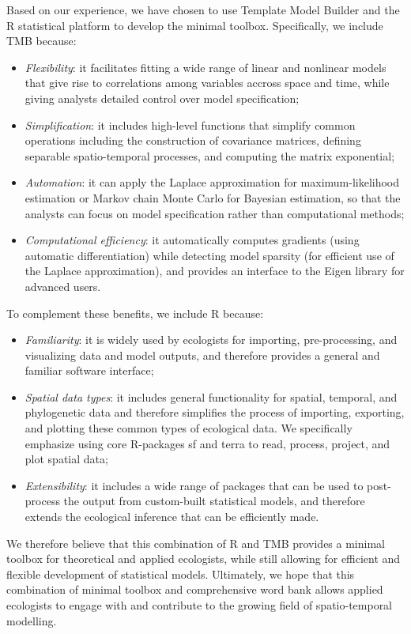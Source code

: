 Based on our experience, we have chosen to use Template Model Builder \cite{kristensen_tmb_2016} and the R statistical platform \cite{r_core_team_r_2021} to develop the minimal toolbox.  Specifically, we include TMB because:
\begin{itemize}
    \item \textit{Flexibility}:  it facilitates fitting a wide range of linear and nonlinear models that give rise to correlations among variables accross space and time, while giving analysts detailed control over model specification;
    
    \item \textit{Simplification}:  it includes high-level functions that simplify common operations including the construction of covariance matrices, defining separable spatio-temporal processes, and computing the matrix exponential;
    
    \item \textit{Automation}: it can apply the Laplace approximation for maximum-likelihood estimation or Markov chain Monte Carlo for Bayesian estimation, so that the analysts can focus on model specification rather than computational methods;
    
    \item \textit{Computational efficiency}: it automatically computes gradients (using automatic differentiation) while detecting model sparsity (for efficient use of the Laplace approximation), and provides an interface to the Eigen library for advanced users.
\end{itemize}
To complement these benefits, we include R because:
\begin{itemize}
    \item \textit{Familiarity}:  it is widely used by ecologists for importing, pre-processing, and visualizing data and model outputs, and therefore provides a general and familiar software interface;
    
    \item \textit{Spatial data types}:  it includes general functionality for spatial, temporal, and phylogenetic data and therefore simplifies the process of importing, exporting, and plotting these common types of ecological data.  We specifically emphasize using core R-packages \colorbox{backcolour}{sf} \cite{pebesma_simple_2018} and \colorbox{backcolour}{terra} \cite{hijmans_package_2022} to read, process, project, and plot spatial data;

    \item \textit{Extensibility}:  it includes a wide range of packages that can be used to post-process the output from custom-built statistical models, and therefore extends the ecological inference that can be efficiently made.
\end{itemize}
We therefore believe that this combination of R and TMB provides a minimal toolbox for theoretical and applied ecologists, while still allowing for efficient and flexible development of statistical models.  Ultimately, we hope that this combination of minimal toolbox and comprehensive word bank allows applied ecologists to engage with and contribute to the growing field of spatio-temporal modelling.  


